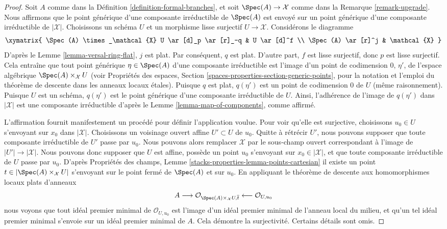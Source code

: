 \begin{proof}
Soit $A$ comme dans la Définition \ref{definition-formal-branches}, et
soit $\Spec(A) \to \mathcal{X}$ comme dans la Remarque \ref{remark-upgrade}.
Nous affirmons que le point générique d'une composante irréductible de
$\Spec(A)$ est envoyé sur un point générique d'une composante irréductible
de $|\mathcal{X}|$. Choisissons un schéma $U$ et un morphisme
lisse surjectif $U \to \mathcal{X}$. Considérons le diagramme
$$
\xymatrix{
\Spec(A) \times_\mathcal{X} U \ar[d]_p \ar[r]_-q & U \ar[d]^f \\
\Spec(A) \ar[r]^j & \mathcal{X}
}
$$
D'après le Lemme \ref{lemma-versal-ring-flat}, $j$ est plat.
Par conséquent, $q$ est plat. D'autre part, $f$ est lisse surjectif,
donc $p$ est lisse surjectif. Cela entraîne que tout point générique
$\eta \in \Spec(A)$ d'une composante irréductible est l'image d'un
point de codimension $0$, $\eta'$, de l'espace algébrique
$\Spec(A) \times_\mathcal{X} U$ (voir
Propriétés des espaces, Section \ref{spaces-properties-section-generic-points},
pour la notation et l'emploi du théorème de descente dans les anneaux locaux étales).
Puisque $q$ est plat, $q(\eta')$ est un point de codimension $0$ de $U$
(même raisonnement).
Puisque $U$ est un schéma, $q(\eta')$ est le point générique
d'une composante irréductible de $U$. Ainsi, l'adhérence de l'image
de $q(\eta')$ dans $|\mathcal{X}|$ est une composante irréductible
d'après le Lemme \ref{lemma-map-of-components}, comme affirmé.

\medskip\noindent
L'affirmation fournit manifestement un procédé pour définir l'application voulue.
Pour voir qu'elle est surjective, choisissons $u_0 \in U$ s'envoyant sur
$x_0$ dans $|\mathcal{X}|$. Choisissons un voisinage ouvert affine $U' \subset U$
de $u_0$. Quitte à rétrécir $U'$, nous pouvons supposer que toute
composante irréductible de $U'$ passe par $u_0$. Nous pouvons alors
remplacer $\mathcal{X}$ par le sous-champ ouvert correspondant à
l'image de $|U'| \to |\mathcal{X}|$. Nous pouvons donc supposer que $U$ est affine,
possède un point $u_0$ s'envoyant sur $x_0 \in |\mathcal{X}|$,
et que toute composante irréductible de $U$ passe par $u_0$.
D'après Propriétés des champs, Lemme
\ref{stacks-properties-lemma-points-cartesian}
il existe un point $t \in |\Spec(A) \times_\mathcal{X} U|$
s'envoyant sur le point fermé de $\Spec(A)$ et sur $u_0$.
En appliquant le théorème de descente aux homomorphismes locaux plats d'anneaux
$$
A \longrightarrow
\mathcal{O}_{\Spec(A) \times_\mathcal{X} U, \overline{t}}
\longleftarrow \mathcal{O}_{U, u_0}
$$
nous voyons que tout idéal premier minimal de $\mathcal{O}_{U, u_0}$
est l'image d'un idéal premier minimal de l'anneau local du milieu,
et qu'un tel idéal premier minimal s'envoie sur un idéal premier minimal de $A$.
Cela démontre la surjectivité. Certains détails sont omis.
\end{proof}

